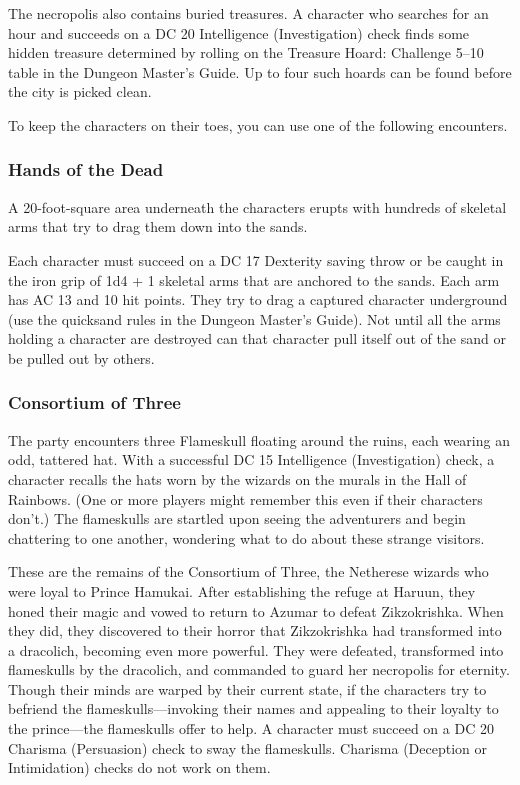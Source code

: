 \documentclass[10pt,a4paper,twoside,bg=print,twocolumn,openany,nodeprecatedcode]{dndbook}
\begin{document}
The necropolis also contains buried treasures. A character who searches for an hour and succeeds on a DC 20 Intelligence (Investigation) check finds some hidden treasure determined by rolling on the Treasure Hoard: Challenge 5–10 table in the Dungeon Master's Guide. Up to four such hoards can be found before the city is picked clean.

To keep the characters on their toes, you can use one of the following encounters.

\subsubsection{Hands of the Dead}
A 20-foot-square area underneath the characters erupts with hundreds of skeletal arms that try to drag them down into the sands.

Each character must succeed on a DC 17 Dexterity saving throw or be caught in the iron grip of 1d4 + 1 skeletal arms that are anchored to the sands. Each arm has AC 13 and 10 hit points. They try to drag a captured character underground (use the quicksand rules in the Dungeon Master's Guide). Not until all the arms holding a character are destroyed can that character pull itself out of the sand or be pulled out by others.

\subsubsection{Consortium of Three}
The party encounters three Flameskull floating around the ruins, each wearing an odd, tattered hat. With a successful DC 15 Intelligence (Investigation) check, a character recalls the hats worn by the wizards on the murals in the Hall of Rainbows. (One or more players might remember this even if their characters don't.) The flameskulls are startled upon seeing the adventurers and begin chattering to one another, wondering what to do about these strange visitors.

These are the remains of the Consortium of Three, the Netherese wizards who were loyal to Prince Hamukai. After establishing the refuge at Haruun, they honed their magic and vowed to return to Azumar to defeat Zikzokrishka. When they did, they discovered to their horror that Zikzokrishka had transformed into a dracolich, becoming even more powerful. They were defeated, transformed into flameskulls by the dracolich, and commanded to guard her necropolis for eternity. Though their minds are warped by their current state, if the characters try to befriend the flameskulls—invoking their names and appealing to their loyalty to the prince—the flameskulls offer to help. A character must succeed on a DC 20 Charisma (Persuasion) check to sway the flameskulls. Charisma (Deception or Intimidation) checks do not work on them.
\end{document}

